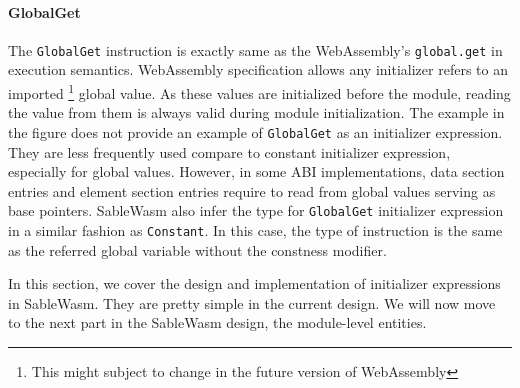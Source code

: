 \paragraph{GlobalGet}
The \texttt{GlobalGet} instruction is exactly same as the WebAssembly's \texttt{global.get} in execution semantics. WebAssembly specification allows any initializer refers to an imported \footnote{This might subject to change in the future version of WebAssembly} global value. As these values are initialized before the module, reading the value from them is always valid during module initialization. The example in the figure does not provide an example of \texttt{GlobalGet} as an initializer expression. They are less frequently used compare to constant initializer expression, especially for global values. However, in some ABI implementations, data section entries and element section entries require to read from global values serving as base pointers. SableWasm also infer the type for \texttt{GlobalGet} initializer expression in a similar fashion as \texttt{Constant}. In this case, the type of instruction is the same as the referred global variable without the constness modifier.

In this section, we cover the design and implementation of initializer expressions in SableWasm. They are pretty simple in the current design. We will now move to the next part in the SableWasm design, the module-level entities.